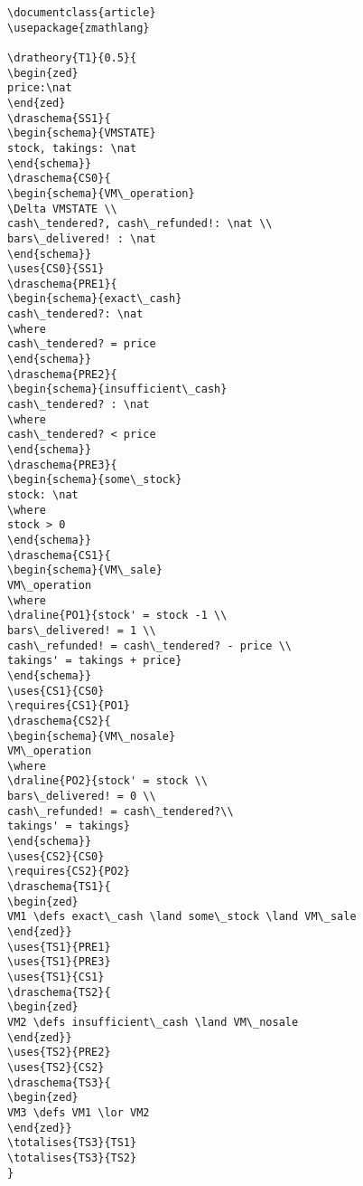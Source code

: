\begin{verbatim}
\documentclass{article}
\usepackage{zmathlang}

\dratheory{T1}{0.5}{
\begin{zed}
price:\nat
\end{zed}
\draschema{SS1}{
\begin{schema}{VMSTATE}
stock, takings: \nat
\end{schema}}
\draschema{CS0}{
\begin{schema}{VM\_operation}
\Delta VMSTATE \\
cash\_tendered?, cash\_refunded!: \nat \\
bars\_delivered! : \nat
\end{schema}}
\uses{CS0}{SS1}
\draschema{PRE1}{
\begin{schema}{exact\_cash}
cash\_tendered?: \nat
\where
cash\_tendered? = price
\end{schema}}
\draschema{PRE2}{
\begin{schema}{insufficient\_cash}
cash\_tendered? : \nat
\where
cash\_tendered? < price
\end{schema}}
\draschema{PRE3}{
\begin{schema}{some\_stock}
stock: \nat
\where
stock > 0
\end{schema}}
\draschema{CS1}{
\begin{schema}{VM\_sale}
VM\_operation
\where
\draline{PO1}{stock' = stock -1 \\
bars\_delivered! = 1 \\
cash\_refunded! = cash\_tendered? - price \\
takings' = takings + price}
\end{schema}}
\uses{CS1}{CS0}
\requires{CS1}{PO1}
\draschema{CS2}{
\begin{schema}{VM\_nosale}
VM\_operation
\where
\draline{PO2}{stock' = stock \\
bars\_delivered! = 0 \\
cash\_refunded! = cash\_tendered?\\
takings' = takings}
\end{schema}}
\uses{CS2}{CS0}
\requires{CS2}{PO2}
\draschema{TS1}{
\begin{zed}
VM1 \defs exact\_cash \land some\_stock \land VM\_sale
\end{zed}}
\uses{TS1}{PRE1}
\uses{TS1}{PRE3}
\uses{TS1}{CS1}
\draschema{TS2}{
\begin{zed}
VM2 \defs insufficient\_cash \land VM\_nosale
\end{zed}}
\uses{TS2}{PRE2}
\uses{TS2}{CS2}
\draschema{TS3}{
\begin{zed}
VM3 \defs VM1 \lor VM2
\end{zed}}
\totalises{TS3}{TS1}
\totalises{TS3}{TS2}
}

\end{verbatim}
